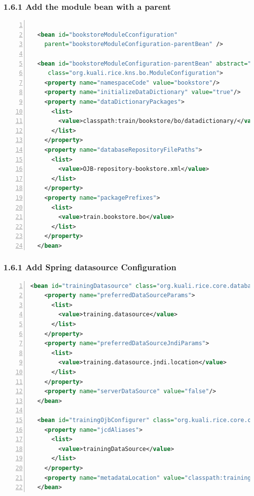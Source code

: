 \subsubsection*{1.6.1 Add the module bean with a parent}
\begin{lstlisting}[numbers=left,language=xml,basicstyle=\scriptsize,backgroundcolor=\color{ubergray},caption={Base
  SpringBeans.xml},frame=single,breaklines=true]

  <bean id="bookstoreModuleCconfiguration"
    parent="bookstoreModuleConfiguration-parentBean" />

  <bean id="bookstoreModuleConfiguration-parentBean" abstract="true"
     class="org.kuali.rice.kns.bo.ModuleConfiguration">
    <property name="namespaceCode" value="bookstore"/>
    <property name="initializeDataDictionary" value="true"/>
    <property name="dataDictionaryPackages">
      <list>
        <value>classpath:train/bookstore/bo/datadictionary/</value>
      </list>
    </property>
    <property name="databaseRepositoryFilePaths">
      <list>
	    <value>OJB-repository-bookstore.xml</value>
      </list>
    </property>
    <property name="packagePrefixes">
      <list>
        <value>train.bookstore.bo</value>
      </list>
    </property>
  </bean>
\end{lstlisting}

\subsubsection*{1.6.1 Add Spring datasource Configuration}
\begin{lstlisting}[basicstyle=\scriptsize,numbers=left,language=xml,backgroundcolor=\color{ubergray},caption={Spring
    datasource setup},frame=single,breaklines=true]
  <bean id="trainingDatasource" class="org.kuali.rice.core.database.PrimaryDataSourceFactoryBean" lazy-init="true">
    <property name="preferredDataSourceParams">
      <list>
        <value>training.datasource</value>
      </list>
    </property>
    <property name="preferredDataSourceJndiParams">
      <list>
        <value>training.datasource.jndi.location</value>
      </list>
    </property>
    <property name="serverDataSource" value="false"/>
  </bean>

  <bean id="trainingOjbConfigurer" class="org.kuali.rice.core.ojb.BaseOjbConfigurer">
    <property name="jcdAliases">
      <list>
        <value>trainingDataSource</value>
      </list>
    </property>
    <property name="metadataLocation" value="classpath:training/OJB-repository-bookstore.xml" />
  </bean>
\end{lstlisting}

